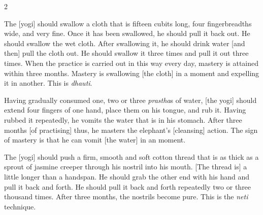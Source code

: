 \begin{nohyp}
\begin{multicols}{2}
\begin{eng}

The [yogi] should swallow a cloth that is fifteen cubits long, four fingerbreadths wide, and very fine. Once it has been swallowed, he should pull it back out. He should swallow the wet cloth. After swallowing it, he should drink water [and then] pull the cloth out. He should swallow it three times and pull it out three times. When the practice is carried out in this way every day, mastery is attained within three months. Mastery is swallowing [the cloth] in a moment and expelling it in another. This is \textit{dhauti}.
\vskip 7pt


Having gradually consumed one, two or three \textit{prastha}s of water, [the yogi] should extend four fingers of one hand, place them on his tongue, and rub it. Having rubbed it repeatedly, he vomits the water that is in his stomach. After three months [of practising] thus, he masters the elephant’s [cleansing] action. The sign of mastery is that he can vomit [the water] in an moment.
\vskip 7pt


The [yogi] should push a firm, smooth and soft cotton thread that is as thick as a sprout of jasmine creeper through his nostril into his mouth. [The thread is] a little longer than a handspan. He should grab the other end with his hand and pull it back and forth.  He should pull it back and forth repeatedly two or three thousand times. After three months, the nostrils become pure. This is the \textit{neti} technique.
\columnbreak



\end{eng}
\end{multicols}
\end{nohyp}
